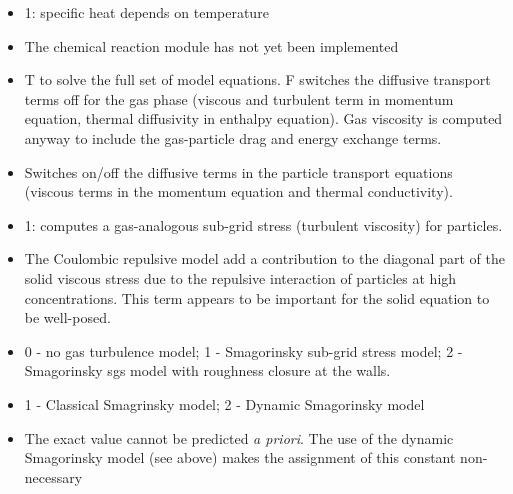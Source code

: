 \begin{itemize}

\item
{}
{1: specific heat depends on temperature}

\item
{}
{The chemical reaction module has not yet been implemented}

\item
{}
{T to solve the full set of model equations. F switches the diffusive
transport terms off for the gas phase (viscous and turbulent term in momentum 
equation, thermal diffusivity in enthalpy equation). 
Gas viscosity is computed anyway to include the gas-particle drag and
energy exchange terms.}

\item
{}
{Switches on/off the diffusive terms in the particle transport equations 
(viscous terms in the momentum equation and thermal conductivity).}

\item
{}
{1: computes a gas-analogous sub-grid stress (turbulent viscosity)
for particles.}

\item
{}
{The Coulombic repulsive model add a contribution to the diagonal part of
the solid viscous stress due to the repulsive interaction of particles 
at high concentrations. This term appears to be important for the solid
equation to be well-posed.}

\item
{}
{0 - no gas turbulence model; 1 - Smagorinsky sub-grid stress model;
2 - Smagorinsky sgs model with roughness closure at the walls.}

\item
{}
{1 - Classical Smagrinsky model; 2 - Dynamic Smagorinsky model}

\item
{}
{The exact value cannot be predicted {\it a priori}. The use of the dynamic
Smagorinsky model (see above) makes the assignment of this constant
non-necessary}


\end{itemize}
